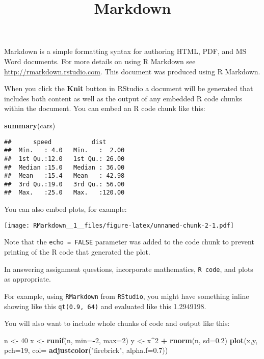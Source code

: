 \documentclass[]{article}
\title{Markdown}
\author{}
\date{}
\newenvironment{Shaded}{\begin{snugshade}}{\end{snugshade}}
\newcommand{\KeywordTok}[1]{\textcolor[rgb]{0.13,0.29,0.53}{\textbf{#1}}}
\newcommand{\DataTypeTok}[1]{\textcolor[rgb]{0.13,0.29,0.53}{#1}}
\newcommand{\DecValTok}[1]{\textcolor[rgb]{0.00,0.00,0.81}{#1}}
\newcommand{\FloatTok}[1]{\textcolor[rgb]{0.00,0.00,0.81}{#1}}
\newcommand{\StringTok}[1]{\textcolor[rgb]{0.31,0.60,0.02}{#1}}
\newcommand{\OperatorTok}[1]{\textcolor[rgb]{0.81,0.36,0.00}{\textbf{#1}}}
\newcommand{\NormalTok}[1]{#1}
\begin{document}
\maketitle

Markdown is a simple formatting syntax for authoring HTML, PDF, and MS
Word documents. For more details on using R Markdown see
\url{http://rmarkdown.rstudio.com}. This document was produced using R
Markdown.

When you click the \textbf{Knit} button in RStudio a document will be
generated that includes both content as well as the output of any
embedded R code chunks within the document. You can embed an R code
chunk like this:

\begin{Shaded}
\begin{Highlighting}[]
\KeywordTok{summary}\NormalTok{(cars)}
\end{Highlighting}
\end{Shaded}

\begin{verbatim}
##      speed           dist       
##  Min.   : 4.0   Min.   :  2.00  
##  1st Qu.:12.0   1st Qu.: 26.00  
##  Median :15.0   Median : 36.00  
##  Mean   :15.4   Mean   : 42.98  
##  3rd Qu.:19.0   3rd Qu.: 56.00  
##  Max.   :25.0   Max.   :120.00
\end{verbatim}

You can also embed plots, for example:

\texttt{[image: RMarkdown\_\_1\_\_files/figure-latex/unnamed-chunk-2-1.pdf]}

Note that the \texttt{echo\ =\ FALSE} parameter was added to the code
chunk to prevent printing of the R code that generated the plot.

In answering assignment questions, incorporate mathematics,
\texttt{R\ code}, and plots as appropriate.

For example, using \texttt{RMarkdown} from \texttt{RStudio}, you might
have something inline showing like this \texttt{qt(0.9,\ 64)} and
evaluated like this 1.2949198.

You will also want to include whole chunks of code and output like this:

\begin{Shaded}
\begin{Highlighting}[]
\NormalTok{n <-}\StringTok{ }\DecValTok{40}
\NormalTok{x <-}\StringTok{ }\KeywordTok{runif}\NormalTok{(n, }\DataTypeTok{min=}\OperatorTok{-}\DecValTok{2}\NormalTok{, }\DataTypeTok{max=}\DecValTok{2}\NormalTok{)}
\NormalTok{y <-}\StringTok{ }\NormalTok{x}\OperatorTok{^}\DecValTok{2} \OperatorTok{+}\StringTok{ }\KeywordTok{rnorm}\NormalTok{(n, }\DataTypeTok{sd=}\FloatTok{0.2}\NormalTok{)}
\KeywordTok{plot}\NormalTok{(x,y, }\DataTypeTok{pch=}\DecValTok{19}\NormalTok{, }\DataTypeTok{col=} \KeywordTok{adjustcolor}\NormalTok{(}\StringTok{"firebrick"}\NormalTok{, }\DataTypeTok{alpha.f=}\FloatTok{0.7}\NormalTok{))}
\end{Highlighting}
\end{Shaded}
\end{document}
